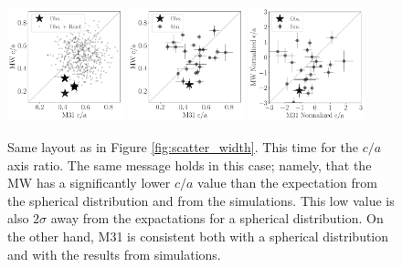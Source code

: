 \documentclass[a4paper,fleqn,usenatbib]{mnras}
\begin{document}
\begin{figure}
\centering
\includegraphics[width=0.30\textwidth]{scatter_random_ranked_ca_ratio.pdf}
\includegraphics[width=0.30\textwidth]{scatter_ranked_illudm_ca_ratio.pdf}
\includegraphics[width=0.30\textwidth]{scatter_norm_ranked_illudm_ca_ratio.pdf}
\caption{Same layout as in Figure \ref{fig:scatter_width}. 
This time for the $c/a$ axis ratio. 
The same message holds in this case; namely, that 
the MW has a significantly lower $c/a$ value than the
expectation from the spherical distribution and from the simulations. 
This low value is also $2\sigma$ away from the expactations for a
spherical distribution.
On the other hand, M31 is consistent both with a spherical
distribution and with the results from simulations.
\label{fig:scatter_ca_ratio}}
\end{figure}
\end{document}
